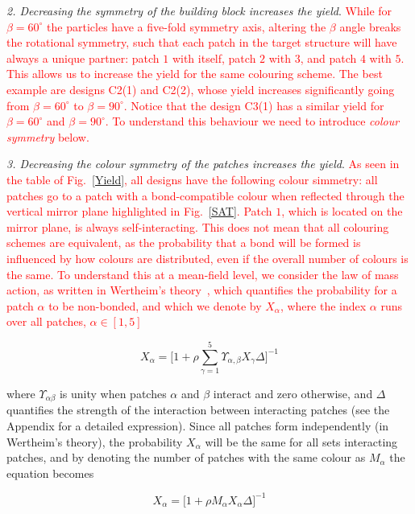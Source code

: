 \documentclass[a4paper, amsfonts, amssymb, amsmath, reprint, showkeys, nofootinbib, twoside]{revtex4-1}
\begin{document}
\noindent
\emph{2. Decreasing the symmetry of the building block increases the yield}. \textcolor{red}{While for $\beta=60^\circ$ the particles have a five-fold symmetry axis, altering the $\beta$ angle breaks the rotational symmetry, such that each patch in the target structure will have always a unique partner: patch $1$ with itself, patch $2$ with $3$, and patch $4$ with $5$. This allows us to increase the yield for the same colouring scheme. The best example are designs C2(1) and C2(2), whose yield increases significantly going from $\beta=60^\circ$ to $\beta=90^\circ$. Notice that the design C3(1) has a similar yield for  $\beta=60^\circ$ and  $\beta=90^\circ$. To understand this behaviour we need to introduce \emph{colour symmetry} below.}


\noindent
\emph{3. Decreasing the colour symmetry of the patches increases the yield}. \textcolor{red}{As seen in the table of Fig.~\ref{Yield}, all designs have the following colour simmetry: all patches go to a patch with a bond-compatible colour when reflected through the vertical mirror plane highlighted in Fig.~\ref{SAT}. Patch $1$, which is located on the mirror plane, is always self-interacting. This does not mean that all colouring schemes are equivalent, as the probability that a bond will be formed is influenced by how colours are distributed, even if the overall number of colours is the same. To understand this at a mean-field level, we consider the law of mass action, as written in Wertheim's theory~\cite{wertheim1984fluids,chapman1988phase,heras2011phase,teixeira2017phase},
which quantifies the probability for a patch $\alpha$ to be non-bonded, and which we denote by $X_{\alpha}$, where the index $\alpha$ runs over all patches, $\alpha\in[1,5]$}

\begin{equation}
X_{\alpha}=\biggl[ 1+ \rho \sum_{\gamma=1}^5 \Upsilon_{\alpha,\beta} X_{\gamma} \Delta\biggr]^{-1}
\end{equation}

\noindent where $\Upsilon_{\alpha\beta}$ is unity when patches $\alpha$ and $\beta$ interact and zero otherwise, and $\Delta$ quantifies the strength of the interaction between interacting patches (see the Appendix for a detailed expression). Since all patches form independently (in Wertheim's theory), the probability $X_\alpha$ will be the same for all sets interacting patches, and by denoting the number of patches with the same colour as $M_\alpha$ the equation becomes

\begin{equation}
X_{\alpha}=\biggl[ 1+ \rho M_\alpha X_{\alpha} \Delta\biggr]^{-1}
\end{equation}
\end{document}
